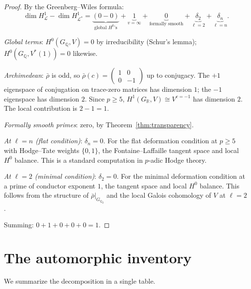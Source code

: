 \documentclass[12pt]{amsart}
\theoremstyle{definition}
\theoremstyle{remark}
\newcommand{\rhobar}{\bar{\rho}}
\newcommand{\GQ}{G_{\mathbb{Q}}}
\begin{document}
\begin{proof}
By the Greenberg--Wiles formula:
$$\dim H^1_{\mathcal{L}} - \dim H^1_{\mathcal{L}^*} = \underbrace{(0 - 0)}_{\text{global }H^0\text{'s}} + \underbrace{1}_{v = \infty} + \underbrace{0}_{\text{formally smooth}} + \underbrace{\delta_2}_{\ell = 2} + \underbrace{\delta_n}_{\ell = n}.$$

\emph{Global terms}: $H^0(\GQ, V) = 0$ by irreducibility (Schur's lemma); $H^0(\GQ, V^*(1)) = 0$ likewise.

\emph{Archimedean}: $\rhobar$ is odd, so $\rhobar(c) = \left(\begin{smallmatrix} 1 & 0 \\ 0 & -1 \end{smallmatrix}\right)$ up to conjugacy. The $+1$ eigenspace of conjugation on trace-zero matrices has dimension $1$; the $-1$ eigenspace has dimension $2$. Since $p \geq 5$, $H^1(G_\mathbb{R}, V) \cong V^{c = -1}$ has dimension $2$. The local contribution is $2 - 1 = 1$.

\emph{Formally smooth primes}: zero, by Theorem~\ref{thm:transparency}.

\emph{At $\ell = n$ (flat condition)}: $\delta_n = 0$. For the flat deformation condition at $p \geq 5$ with Hodge--Tate weights $\{0, 1\}$, the Fontaine--Laffaille tangent space and local $H^0$ balance. This is a standard computation in $p$-adic Hodge theory.

\emph{At $\ell = 2$ (minimal condition)}: $\delta_2 = 0$. For the minimal deformation condition at a prime of conductor exponent $1$, the tangent space and local $H^0$ balance. This follows from the structure of $\rhobar|_{G_{\mathbb{Q}_2}}$ and the local Galois cohomology of $V$ at $\ell = 2$.

Summing: $0 + 1 + 0 + 0 + 0 = 1$.
\end{proof}

\section{The automorphic inventory}
\label{sec:inventory}

We summarize the decomposition in a single table.
\end{document}
